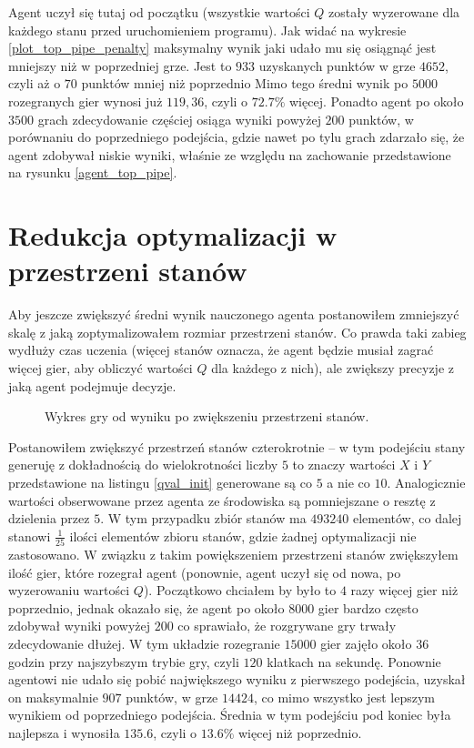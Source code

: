 \documentclass[a4paper, 12pt,oneside]{book}
\begin{document}
Agent uczył się tutaj od początku (wszystkie wartości $Q$ zostały wyzerowane
dla każdego stanu przed uruchomieniem programu).
Jak widać na wykresie \ref{plot_top_pipe_penalty} maksymalny wynik jaki 
udało mu się osiągnąć jest mniejszy niż w poprzedniej grze. Jest to $933$
uzyskanych punktów w grze $4652$, czyli aż o $70$ punktów mniej niż poprzednio
Mimo tego średni wynik po $5000$ rozegranych gier wynosi już $119,36$, czyli o 
$72.7\%$ więcej. Ponadto agent po około
$3500$ grach zdecydowanie częściej osiąga wyniki powyżej $200$ punktów, w
porównaniu do poprzedniego podejścia, gdzie nawet po tylu grach zdarzało się,
że agent zdobywał niskie wyniki, właśnie ze względu na zachowanie przedstawione
na rysunku \ref{agent_top_pipe}.

\section{Redukcja optymalizacji w przestrzeni stanów}
Aby jeszcze zwiększyć średni wynik nauczonego agenta postanowiłem zmniejszyć
skalę z jaką zoptymalizowałem rozmiar przestrzeni stanów. Co prawda taki zabieg
wydłuży czas uczenia (więcej stanów oznacza, że agent będzie musiał zagrać
więcej gier, aby obliczyć wartości $Q$ dla każdego z nich), ale zwiększy
precyzje z jaką agent podejmuje decyzje.
\begin{figure}[!htb]
	\begin{center}
		
	\end{center}
	\caption{Wykres gry od wyniku po zwiększeniu przestrzeni stanów.}
	\label{plot_gird_5x5}
\end{figure}

Postanowiłem zwiększyć przestrzeń stanów czterokrotnie -- w tym podejściu stany
generuję z dokładnością do wielokrotności liczby $5$ to znaczy wartości $X$ i
$Y$ przedstawione na listingu \ref{qval_init} generowane są co $5$ a nie co
$10$. Analogicznie wartości obserwowane przez agenta ze środowiska są
pomniejszane o resztę z dzielenia przez $5$. W tym przypadku zbiór stanów ma
$493 240$ elementów, co dalej stanowi $\frac{1}{25}$ ilości elementów
zbioru stanów, gdzie żadnej optymalizacji nie zastosowano. W związku z takim
powiększeniem przestrzeni stanów zwiększyłem ilość gier, które rozegrał agent
(ponownie, agent uczył się od nowa, po wyzerowaniu wartości $Q$). Początkowo
chciałem by było to $4$ razy więcej gier niż poprzednio, jednak okazało się,
że agent po około $8000$ gier bardzo często zdobywał wyniki powyżej $200$ co
sprawiało, że rozgrywane gry trwały zdecydowanie dłużej. W tym układzie
rozegranie $15000$ gier zajęło około $36$ godzin przy najszybszym trybie gry,
czyli $120$ klatkach na sekundę. Ponownie agentowi nie udało się pobić
największego wyniku z pierwszego podejścia, uzyskał on maksymalnie $907$
punktów, w grze $14424$, co mimo wszystko jest lepszym wynikiem od poprzedniego
podejścia. Średnia w tym podejściu pod koniec była najlepsza i wynosiła
$135.6$, czyli o $13.6\%$ więcej niż poprzednio.
\end{document}

